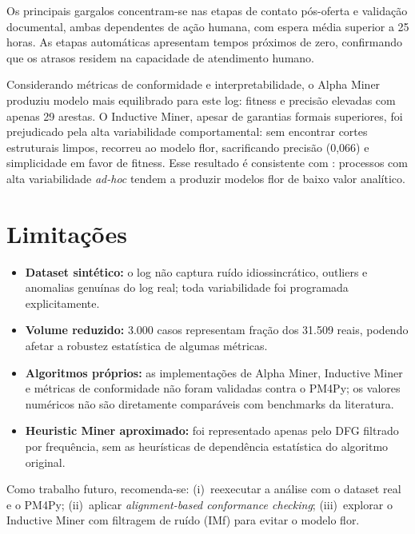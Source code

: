 \documentclass[12pt,a4paper]{article}
\begin{document}
Os principais gargalos concentram-se nas etapas de contato pós-oferta e validação documental, ambas dependentes de ação humana, com espera média superior a 25 horas. As etapas automáticas apresentam tempos próximos de zero, confirmando que os atrasos residem na capacidade de atendimento humano.

Considerando métricas de conformidade e interpretabilidade, o Alpha Miner produziu modelo mais equilibrado para este log: fitness e precisão elevadas com apenas 29 arestas. O Inductive Miner, apesar de garantias formais superiores, foi prejudicado pela alta variabilidade comportamental: sem encontrar cortes estruturais limpos, recorreu ao modelo flor, sacrificando precisão (0,066) e simplicidade em favor de fitness. Esse resultado é consistente com \cite{leemans2013}: processos com alta variabilidade \textit{ad-hoc} tendem a produzir modelos flor de baixo valor analítico.

\section{Limitações}
\label{sec:limitacoes}

\begin{itemize}
  \item \textbf{Dataset sintético:} o log não captura ruído idiossincrático, outliers e anomalias genuínas do log real; toda variabilidade foi programada explicitamente.
  \item \textbf{Volume reduzido:} 3.000 casos representam fração dos 31.509 reais, podendo afetar a robustez estatística de algumas métricas.
  \item \textbf{Algoritmos próprios:} as implementações de Alpha Miner, Inductive Miner e métricas de conformidade não foram validadas contra o PM4Py; os valores numéricos não são diretamente comparáveis com benchmarks da literatura.
  \item \textbf{Heuristic Miner aproximado:} foi representado apenas pelo DFG filtrado por frequência, sem as heurísticas de dependência estatística do algoritmo original.
\end{itemize}

Como trabalho futuro, recomenda-se: (i)~reexecutar a análise com o dataset real e o PM4Py; (ii)~aplicar \textit{alignment-based conformance checking}; (iii)~explorar o Inductive Miner com filtragem de ruído (IMf) para evitar o modelo flor.
\end{document}

